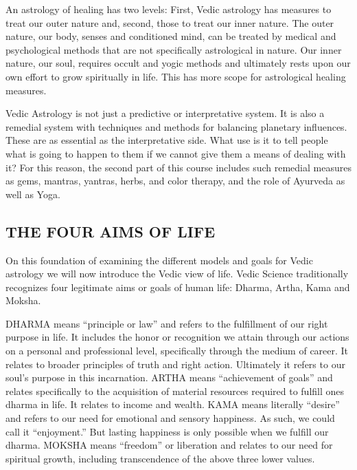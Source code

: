  

An astrology of healing has two levels: First, Vedic astrology has measures to treat our outer nature and, second, those to treat our inner nature. The outer nature, our body, senses and conditioned mind, can be treated by medical and psychological methods that are not specifically astrological in nature. Our inner nature, our soul, requires occult and yogic methods and ultimately rests upon our own effort to grow spiritually in life. This has more scope for astrological healing measures.

 

Vedic Astrology is not just a predictive or interpretative system.  It is also a remedial system with techniques and methods for balancing planetary influences. These are as essential as the interpretative side. What use is it to tell people what is going to happen to them if we cannot give them a means of dealing with it? For this reason, the second part of this course includes such remedial measures as gems, mantras, yantras, herbs, and color therapy, and the role of Ayurveda as well as Yoga.

 


\subsection{THE FOUR AIMS OF LIFE}
 

On this foundation of examining the different models and goals for Vedic astrology we will now introduce the Vedic view of life. Vedic Science traditionally recognizes four legitimate aims or goals of human life: Dharma, Artha, Kama and Moksha.

 

DHARMA means “principle or law” and refers to the fulfill­ment of our right purpose in life.  It includes the honor or recognition we attain through our actions on a personal and professional level, specifically through the medium of career. It relates to broader principles of truth and right action. Ultimately it refers to our soul’s purpose in this incarnation.
ARTHA means “achievement of goals” and relates specifically to the acquisition of material resources required to fulfill ones dharma in life.  It relates to income and wealth.
KAMA means literally “desire” and refers to our need for emotional and sensory happiness. As such, we could call it “enjoyment.” But lasting happiness is only possible when we fulfill our dharma.
MOKSHA means “freedom” or liberation and relates to our need for spiritual growth, including transcendence of the above three lower values.
 

